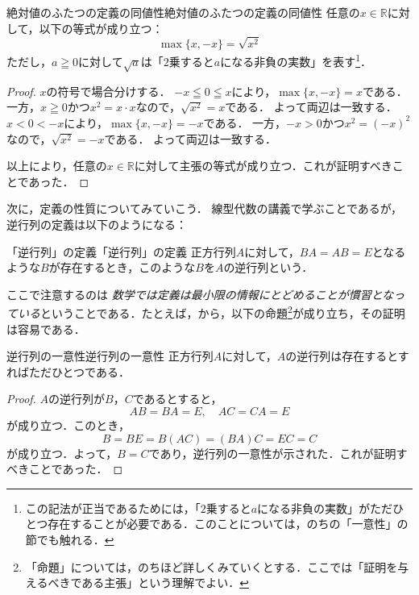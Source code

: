 \begin{prop}{絶対値のふたつの定義の同値性}{絶対値のふたつの定義の同値性}
  任意の$x \in \mathbb{R}$に対して，以下の等式が成り立つ：
  \[
    \max \{ x , -x \} = \sqrt{x^2}
  \]
  ただし，$a \geqq 0$に対して$\sqrt{a}$は「$2$乗すると$a$になる非負の実数」を表す\footnote{この記法が正当であるためには，「$2$乗すると$a$になる非負の実数」がただひとつ存在することが必要である．このことについては，のちの「一意性」の節でも触れる．}．
\end{prop}
 
\begin{leftbar}
  \begin{proof}
    $x$の符号で場合分けする．
            $-x \leqq 0 \leqq x$により，$\max \{ x,-x \} = x$である．
            一方，$x \geqq 0$かつ$x^2 = x \cdot x$なので，$\sqrt{x^2}=x$である．
            よって両辺は一致する．
            $x < 0 < -x$により，$\max \{ x,-x \} = -x$である．
            一方，$-x > 0$かつ$x^2 = (-x)^2$なので，$\sqrt{x^2}=-x$である．
            よって両辺は一致する．
            
            \smallskip
    以上により，任意の$x \in \mathbb{R}$に対して主張の等式が成り立つ．これが証明すべきことであった．
  \end{proof}
\end{leftbar}

次に，定義の性質についてみていこう．
線型代数の講義で学ぶことであるが，逆行列の定義は以下のようになる：

\begin{example}{「逆行列」の定義}{「逆行列」の定義}
  正方行列$A$に対して，$BA = AB =E$となるような$B$が存在するとき，このような$B$を$A$の逆行列という．
\end{example}


ここで注意するのは \emph{数学では定義は最小限の情報にとどめることが慣習となっている}ということである．たとえば，から，以下の命題\footnote{「命題」については，のちほど詳しくみていくとする．ここでは「証明を与えるべきである主張」という理解でよい．}が成り立ち，その証明は容易である．

\begin{prop}{逆行列の一意性}{逆行列の一意性}
  正方行列$A$に対して，$A$の逆行列は存在するとすればただひとつである．
\end{prop}

\begin{tleftbar}
  \begin{proof}
    $A$の逆行列が$B$，$C$であるとすると，
    \[
      AB=BA=E,\quad AC=CA=E
    \]
    が成り立つ．このとき，
    \[
      B=BE=B(AC)=(BA)C=EC=C
    \]
    が成り立つ．よって，$B=C$であり，逆行列の一意性が示された．これが証明すべきことであった．
  \end{proof}
\end{tleftbar}

